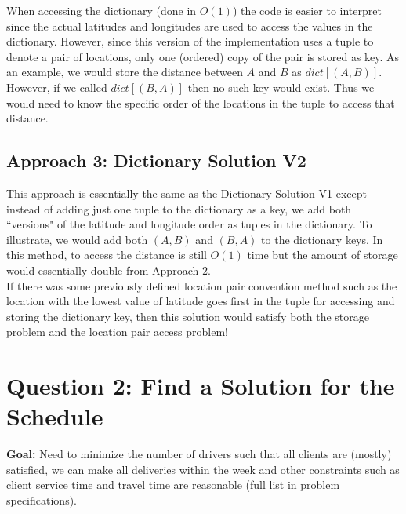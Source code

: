 \documentclass{article}
\begin{document}
When accessing the dictionary (done in $O(1)$) the code is easier to interpret since the actual latitudes and longitudes are used to access the values in the dictionary.  However, since this version of the implementation uses a tuple to denote a pair of locations, only one (ordered) copy of the pair is stored as key.  As an example, we would store the distance between $A$ and $B$ as $dict[(A,B)]$.  However, if we called $dict[(B,A)]$ then no such key would exist.  Thus we would need to know the specific order of the locations in the tuple to access that distance. 

\subsection{Approach 3: Dictionary Solution V2}
This approach is essentially the same as the Dictionary Solution V1 except instead of adding just one tuple to the dictionary as a key, we add both ``versions" of the latitude and longitude order as tuples in the dictionary.  To illustrate, we would add both $(A,B)$ and $(B,A)$ to the dictionary keys.  In this method, to access the distance is still $O(1)$ time but the amount of storage would essentially double from Approach 2.\\

If there was some previously defined location pair convention method such as the location with the lowest value of latitude goes first in the tuple for accessing and storing the dictionary key, then this solution would satisfy both the storage problem and the location pair access problem!

\section{Question 2: Find a Solution for the Schedule}
\textbf{Goal:} Need to minimize the number of drivers such that all clients are
(mostly) satisfied, we can make all deliveries within the week and other constraints
such as client service time and travel time are reasonable (full list in problem specifications).\\
\end{document}
